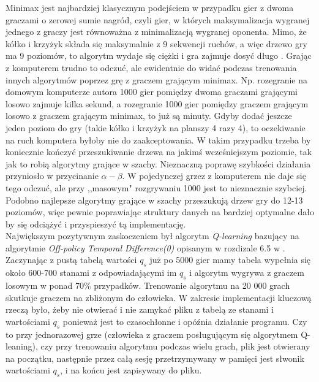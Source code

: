 \documentclass[licencjacka]{pracamgr}
\begin{document}
Minimax jest najbardziej klasycznym podejściem w przypadku gier z dwoma graczami o zerowej sumie nagród,  czyli gier, w których maksymalizacja wygranej jednego z graczy jest równoważna z minimalizacją wygranej oponenta.   Mimo, że kółko i krzyżyk składa się maksymalnie z 9 sekwencji ruchów, a więc drzewo gry ma 9 poziomów, to algorytm wydaje się ciężki i gra zajmuje dosyć długo . Grając z komputerem trudno to odczuć, ale ewidentnie do widać podczas trenowania innych algorytmów poprzez grę z graczem grającym minimax. Np. rozegranie na domowym komputerze autora 1000 gier pomiędzy dwoma graczami grającymi losowo zajmuje kilka sekund, a rozegranie 1000 gier pomiędzy graczem grającym losowo z graczem grającym minimax, to już są minuty. Gdyby dodać jeszcze jeden poziom do gry (takie kółko i krzyżyk na planszy 4 razy 4), to oczekiwanie na ruch komputera byłoby nie do zaakceptowania. W takim przypadku trzeba by koniecznie kończyć przeszukiwanie drzewa na jakimś wcześniejszym poziomie, tak jak to robią algorytmy grające w szachy.  Nieznaczną poprawę szybkości działania przyniosło w przycinanie $\alpha-\beta$. W pojedynczej grzez z komputerem nie daje się tego odczuć, ale przy ,,masowym" rozgrywaniu 1000 jest to nieznacznie szybciej. Podobno najlepsze algorytmy grające w szachy przeszukują drzew gry do 12-13 poziomów, więc pewnie poprawiając struktury danych na bardziej optymalne dało by się odciążyć i przyspieszyć tą implementację.\\

Największym pozytywnym zaskoczeniem był algorytm  \textit{Q-learning} bazujący na algorytmie \textit{Off-policy Temporal Difference(0)} opisanym w rozdizale 6.5 w \cite{RL}. Zaczynając z pustą tabelą wartości $q_{s}$ już po 5000 gier mamy tabela wypełnia się około 600-700 stanami z odpowiadającymi im $q_{s}$ i algorytm wygrywa z graczem losowym w ponad 70\% przypadków. Trenowanie algorytmu na 20 000 grach skutkuje graczem na zbliżonym do człowieka. W zakresie implementacji kluczową rzeczą było, żeby nie otwierać i nie zamykać pliku z  tabelą  ze stanami i wartościami $q_{s}$ ponieważ jest to czasochłonne i opóźnia działanie programu. Czy to przy  jednorazowej grze (człowieka z graczem posługującym się algorytmem Q-leaning), czy przy trenowaniu algorytmu podczas wielu grach,  plik jest otwierany na początku, następnie przez całą sesję przetrzymywany w pamięci jest słwonik wartościami $q_{s}$, i na końcu jest zapisywany do pliku.\\ 
\end{document}
